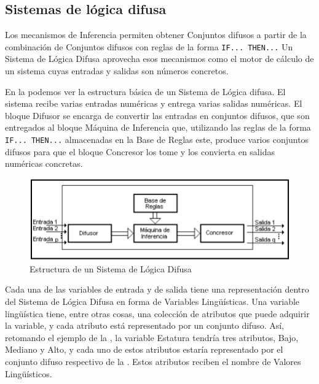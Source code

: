\subsection{Sistemas de lógica difusa}
Los mecanismos de Inferencia permiten
obtener Conjuntos difusos a partir de la combinación de Conjuntos difusos
con reglas de la forma \texttt{IF... THEN...} Un Sistema de Lógica Difusa aprovecha
esos mecanismos como el motor de cálculo de un sistema cuyas entradas y
salidas son números concretos.

En la  podemos ver la estructura básica de un Sistema de Lógica difusa.
El sistema recibe varias entradas numéricas y entrega varias salidas
numéricas. El bloque Difusor se encarga de convertir las entradas en
conjuntos difusos, que son entregados al bloque Máquina de Inferencia que, utilizando las reglas de la forma \texttt{IF... THEN...} almacenadas en la Base de Reglas  este, produce varios conjuntos difusos para
que el bloque Concresor los tome y los convierta en salidas numéricas
concretas.
\begin{figure}[H]
	\centering
	\includegraphics[scale=0.67]{images/sistemas_difusos.png}
	\caption{Estructura de un Sistema de Lógica Difusa}
	\label{fig:sistemas_difusos}
\end{figure}


Cada una de las variables de entrada y de salida tiene una representación
dentro del Sistema de Lógica Difusa en forma de Variables Lingüísticas. Una
variable lingüística tiene, entre otras cosas, una colección de atributos que
puede adquirir la variable, y cada atributo está representado por un conjunto
difuso. Así, retomando el ejemplo de la , la variable Estatura tendría
tres atributos, Bajo, Mediano y Alto, y cada uno de estos atributos estaría
representado por el conjunto difuso respectivo de la . Estos atributos
reciben el nombre de Valores Lingüísticos.